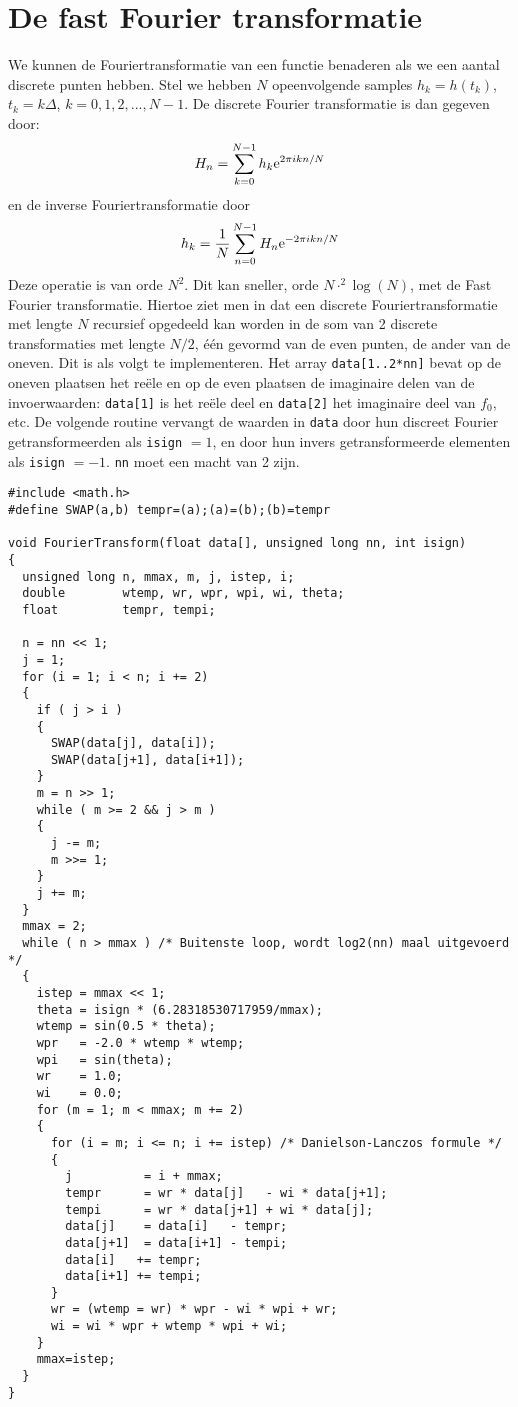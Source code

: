 \section{De fast Fourier transformatie}
We kunnen de Fouriertransformatie van een functie benaderen als we een aantal
discrete punten hebben. Stel we hebben $N$ opeenvolgende samples $h_k=h(t_k)$,
$t_k=k\Delta$, $k=0,1,2,...,N-1$. De discrete Fourier transformatie is dan
gegeven door:
\[
H_n=\sum_{k=0}^{N-1}h_k{\rm e}^{2\pi ikn/N}
\]
en de inverse Fouriertransformatie door
\[
h_k=\frac{1}{N}\sum_{n=0}^{N-1}H_n{\rm e}^{-2\pi ikn/N}
\]
Deze operatie is van orde $N^2$. Dit kan sneller, orde $N\cdot^2\log(N)$,
met de Fast Fourier transformatie. Hiertoe ziet men in dat een discrete
Fouriertransformatie met lengte $N$ recursief opgedeeld kan worden in de som
van 2 discrete transformaties met lengte $N/2$, \'e\'en gevormd van de even
punten, de ander van de oneven.
\npar
Dit is als volgt te implementeren.
Het array {\tt data[1..2*nn]} bevat op de oneven plaatsen het re\"ele en
op de even plaatsen de imaginaire delen van de invoerwaarden: {\tt data[1]}
is het re\"ele deel en {\tt data[2]} het imaginaire deel van $f_0$, etc. De
volgende routine vervangt de waarden in {\tt data} door hun discreet Fourier
getransformeerden als {\tt isign} $=1$, en door hun invers getransformeerde
elementen als {\tt isign} $=-1$. {\tt nn} moet een macht van 2 zijn.
\begin{verbatim}
#include <math.h>
#define SWAP(a,b) tempr=(a);(a)=(b);(b)=tempr

void FourierTransform(float data[], unsigned long nn, int isign)
{
  unsigned long n, mmax, m, j, istep, i;
  double        wtemp, wr, wpr, wpi, wi, theta;
  float         tempr, tempi;

  n = nn << 1;
  j = 1;
  for (i = 1; i < n; i += 2)
  {
    if ( j > i )
    {
      SWAP(data[j], data[i]);
      SWAP(data[j+1], data[i+1]);
    }
    m = n >> 1;
    while ( m >= 2 && j > m )
    {
      j -= m;
      m >>= 1;
    }
    j += m;
  }
  mmax = 2;
  while ( n > mmax ) /* Buitenste loop, wordt log2(nn) maal uitgevoerd */
  {
    istep = mmax << 1;
    theta = isign * (6.28318530717959/mmax);
    wtemp = sin(0.5 * theta);
    wpr   = -2.0 * wtemp * wtemp;
    wpi   = sin(theta);
    wr    = 1.0;
    wi    = 0.0;
    for (m = 1; m < mmax; m += 2)
    {
      for (i = m; i <= n; i += istep) /* Danielson-Lanczos formule */
      {
        j          = i + mmax;
        tempr      = wr * data[j]   - wi * data[j+1];
        tempi      = wr * data[j+1] + wi * data[j];
        data[j]    = data[i]   - tempr;
        data[j+1]  = data[i+1] - tempi;
        data[i]   += tempr;
        data[i+1] += tempi;
      }
      wr = (wtemp = wr) * wpr - wi * wpi + wr;
      wi = wi * wpr + wtemp * wpi + wi;
    }
    mmax=istep;
  }
}
\end{verbatim}




